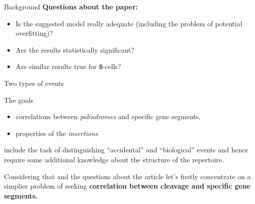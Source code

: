 \documentclass{beamer}\usepackage[]{graphicx}\usepackage[]{color}
\begin{document}
\begin{frame}{Background}
  \textbf{Questions about the paper:}
  \begin{itemize}
    \item Is the suggested model really adequate (including the problem of potential overfitting)?
    \item Are the results statistically significant?
    \item Are similar results true for \texttt{B}-cells?
  \end{itemize}
% 
\end{frame}

\begin{frame}{Two types of events}
  

  The goals 
  \begin{itemize}
    \item correlations between \textit{palindromes} and specific gene segments,
    \item properties of the \textit{insertions}
  \end{itemize}
  include the task of distinguishing ``accidental'' and ``biological'' events and hence require some additional knowledge about the structure of the repertoire.
 
  \bigskip
  Considering that and the questions about the article let's firstly concentrate on a simplier problem of seeking \textbf{correlation between cleavage and specific gene segments.} 
\end{frame}
\end{document}
